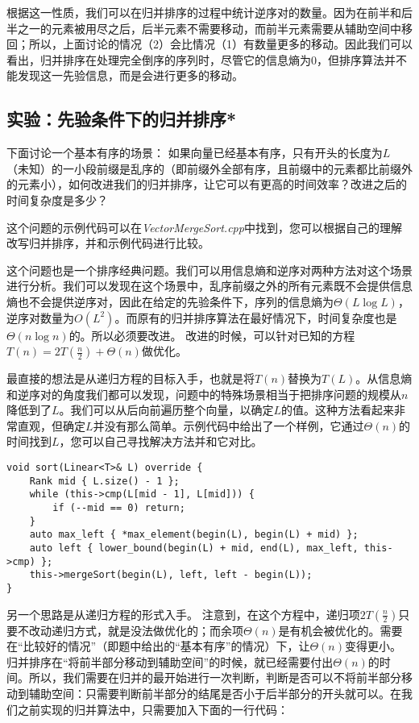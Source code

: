 根据这一性质，我们可以在归并排序的过程中统计逆序对的数量。因为在前半和后半之一的元素被用尽之后，后半元素不需要移动，而前半元素需要从辅助空间中移回；所以，上面讨论的情况（2）会比情况（1）有数量更多的移动。因此我们可以看出，归并排序在处理完全倒序的序列时，尽管它的信息熵为0，但排序算法并不能发现这一先验信息，而是会进行更多的移动。

\subsection{实验：先验条件下的归并排序*}
\label{vec:先验条件下的归并排序}
下面讨论一个基本有序的场景：
如果向量已经基本有序，只有开头的长度为$L$（未知）的一小段前缀是乱序的（即前缀外全部有序，且前缀中的元素都比前缀外的元素小），如何改进我们的归并排序，让它可以有更高的时间效率？改进之后的时间复杂度是多少？

这个问题的示例代码可以在\textit{VectorMergeSort.cpp}中找到，您可以根据自己的理解改写归并排序，并和示例代码进行比较。

这个问题也是一个排序经典问题。我们可以用信息熵和逆序对两种方法对这个场景进行分析。我们可以发现在这个场景中，乱序前缀之外的所有元素既不会提供信息熵也不会提供逆序对，因此在给定的先验条件下，序列的信息熵为$\Theta(L\log L)$，逆序对数量为$O(L^2)$。而原有的归并排序算法在最好情况下，时间复杂度也是$\Theta(n\log n)$的。所以必须要改进。
改进的时候，可以针对已知的方程$T(n)=2T\left(\frac n2\right)+\Theta(n)$做优化。

最直接的想法是从递归方程的目标入手，也就是将$T(n)$替换为$T(L)$。从信息熵和逆序对的角度我们都可以发现，问题中的特殊场景相当于把排序问题的规模从$n$降低到了$L$。我们可以从后向前遍历整个向量，以确定$L$的值。这种方法看起来非常直观，但确定$L$并没有那么简单。示例代码中给出了一个样例，它通过$\Theta(n)$的时间找到$L$，您可以自己寻找解决方法并和它对比。

\begin{lstlisting}
void sort(Linear<T>& L) override {
    Rank mid { L.size() - 1 };
    while (this->cmp(L[mid - 1], L[mid])) {
        if (--mid == 0) return;
    }
    auto max_left { *max_element(begin(L), begin(L) + mid) };
    auto left { lower_bound(begin(L) + mid, end(L), max_left, this->cmp) };
    this->mergeSort(begin(L), left, left - begin(L));
}
\end{lstlisting}

另一个思路是从递归方程的形式入手。
注意到，在这个方程中，递归项$2T\left(\frac n2\right)$只要不改动递归方式，就是没法做优化的；而余项$\Theta(n)$是有机会被优化的。需要在“比较好的情况”（即题中给出的“基本有序”的情况）下，让$\Theta(n)$变得更小。
归并排序在“将前半部分移动到辅助空间”的时候，就已经需要付出$\Theta(n)$的时间。所以，我们需要在归并的最开始进行一次判断，判断是否可以不将前半部分移动到辅助空间：只需要判断前半部分的结尾是否小于后半部分的开头就可以。在我们之前实现的归并算法中，只需要加入下面的一行代码：

